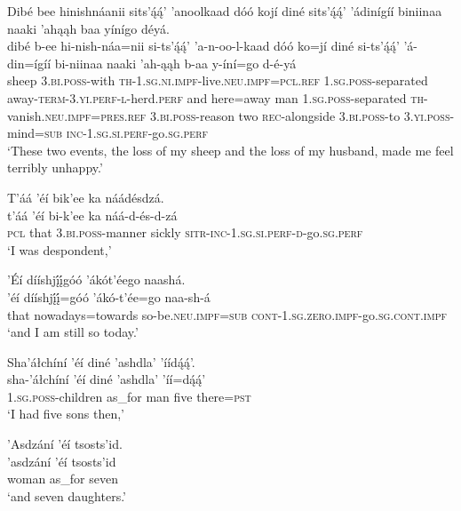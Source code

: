 \ea\label{ex:text8-3-1}
Dibé bee hinishnáanii sits’ą́ą́’ ’anoolkaad dóó kojí diné sits’ą́ą́’ ’ádinígíí biniinaa naaki ’ahąąh baa yínígo déyá.\\
\gll dibé	b-ee	hi-nish-náa=nii	si-ts’ą́ą́’	’a-n-oo-l-kaad	dóó	ko=jí	diné	si-ts’ą́ą́’	’á-din=ígíí	bi-niinaa	naaki	’ah-ąąh	b-aa	y-íní=go	d-é-yá\\
     sheep	3.\textsc{bi}.\textsc{poss}-with	\textsc{th}-1.\textsc{sg}.\textsc{ni}.\textsc{impf}-live.\textsc{neu}.\textsc{impf}=\textsc{pcl}.\textsc{ref}	1.\textsc{sg}.\textsc{poss}-separated	away-\textsc{term}-3.\textsc{yi}.\textsc{perf}-\textsc{l}-herd.\textsc{perf}	and	here=away	man	1.\textsc{sg}.\textsc{poss}-separated	\textsc{th}-vanish.\textsc{neu}.\textsc{impf}=\textsc{pres}.\textsc{ref}	3.\textsc{bi}.\textsc{poss}-reason	two	\textsc{rec}-alongside	3.\textsc{bi}.\textsc{poss}-to	3.\textsc{yi}.\textsc{poss}-mind=\textsc{sub}	\textsc{inc}-1.\textsc{sg}.\textsc{si}.\textsc{perf}-go.\textsc{sg}.\textsc{perf}\\
\glt `These two events, the loss of my sheep and the loss of my husband, made me feel terribly unhappy.'
\z

\ea\label{ex:text8-3-2}
T’áá ’éí bik’ee ka náádésdzá.\\
\gll t’áá ’éí	bi-k’ee	ka	náá-d-és-d-zá\\
     \textsc{pcl} that	3.\textsc{bi}.\textsc{poss}-manner	sickly	\textsc{sitr}-\textsc{inc}-1.\textsc{sg}.\textsc{si}.\textsc{perf}-\textsc{d}-go.\textsc{sg}.\textsc{perf}\\
\glt `I was despondent,'
\z

\ea\label{ex:text8-3-3}
’Éí dííshjį́į́góó ’ákót’éego naashá.\\
\gll ’éí	dííshjį́į́=góó	’ákó-t’ée=go	naa-sh-á\\
     that	nowadays=towards	so-be.\textsc{neu}.\textsc{impf}=\textsc{sub}	\textsc{cont}-1.\textsc{sg}.\textsc{zero}.\textsc{impf}-go.\textsc{sg}.\textsc{cont}.\textsc{impf}\\
\glt `and I am still so today.'
\z

\ea\label{ex:text8-3-4}
Sha’áłchíní ’éí diné ’ashdla’ ’íídą́ą́’.\\
\gll sha-’áłchíní	’éí	diné	’ashdla’	’íí=dą́ą́’\\
     1.\textsc{sg}.\textsc{poss}-children	as\_for	man	five	there=\textsc{pst}\\
\glt `I had five sons then,'
\z

\ea\label{ex:text8-3-5}
’Asdzání ’éí tsosts’id.\\
\gll ’asdzání	’éí	tsosts’id\\
     woman	as\_for	seven\\
\glt `and seven daughters.'
\z

